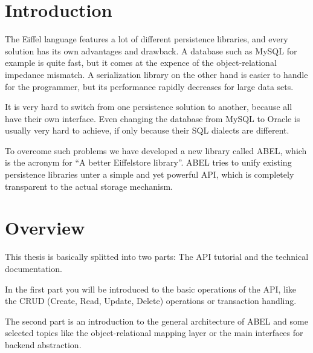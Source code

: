 \section{Introduction}

The Eiffel language \cite{EcmaEiffel} \cite{Meyer09} features a lot of different persistence libraries, and every solution has its own advantages and drawback.
A database such as MySQL \cite {MySQL} for example is quite fast, but it comes at the expence of the object-relational impedance mismatch.
A serialization library on the other hand is easier to handle for the programmer, but its performance rapidly decreases for large data sets.

It is very hard to switch from one persistence solution to another, because all have their own interface.
Even changing the database from MySQL to Oracle  is usually very hard to achieve, if only because their SQL dialects are different.

To overcome such problems we have developed a new library called ABEL, which is the acronym for ``A better Eiffelstore library''.
ABEL tries to unify existing persistence libraries unter a simple and yet powerful API, which is completely transparent to the actual storage mechanism.


\section{Overview}
This thesis is basically splitted into two parts: The API tutorial and the technical documentation.

In the first part you will be introduced to the basic operations of the API, like the CRUD (Create, Read, Update, Delete) operations or transaction handling.

The second part is an introduction to the general architecture of ABEL and some selected topics like the object-relational mapping layer or the main interfaces for backend abstraction.